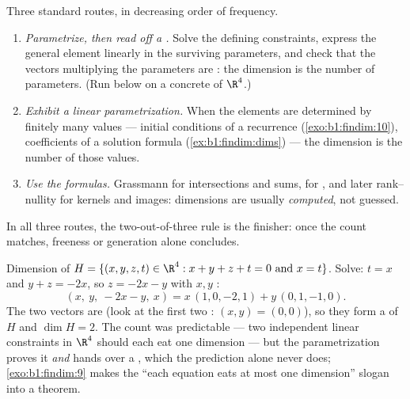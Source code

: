 \begin{method}
\label{met:b1:findim:computedim}
Three standard routes, in decreasing order of frequency.
\begin{enumerate}
  \item \emph{Parametrize, then read off a .} Solve the
        defining constraints, express the general element
        linearly in the surviving parameters, and check that the
        vectors multiplying the parameters are : the
        dimension is the number of parameters. (Run below on a
        concrete  of $\R^4$.)
  \item \emph{Exhibit a  linear parametrization.} When
        the elements are determined by finitely many values ---
        initial conditions of a recurrence
        (\cref{exo:b1:findim:10}), coefficients of a solution
        formula (\cref{ex:b1:findim:dims}) --- the dimension is
        the number of those values.
  \item \emph{Use the formulas.} Grassmann for intersections and
        sums,  for , and later rank--nullity for
        kernels and images: dimensions are usually
        \emph{computed}, not guessed.
\end{enumerate}
In all three routes, the two-out-of-three rule is the finisher:
once the count matches, freeness or generation alone concludes.
\end{method}

\begin{example}
\label{ex:b1:findim:parametrize}
Dimension of $H = \{(x, y, z, t) \in \R^4 : x + y + z + t = 0
\text{ and } x = t\}$. Solve: $t = x$ and $y + z = -2x$, so $z =
-2x - y$ with $x, y$ :
\[
(x,\ y,\ -2x - y,\ x) = x\,(1, 0, -2, 1) + y\,(0, 1, -1, 0) .
\]
The two vectors are  (look at the first two :
$(x, y) = (0,0)$), so they form a  of $H$ and $\dim H = 2$.
The count was predictable --- two independent linear constraints
in $\R^4$ should each eat one dimension --- but the
parametrization proves it \emph{and} hands over a , which
the prediction alone never does; \cref{exo:b1:findim:9} makes
the ``each equation eats at most one dimension'' slogan into a
theorem.
\end{example}

